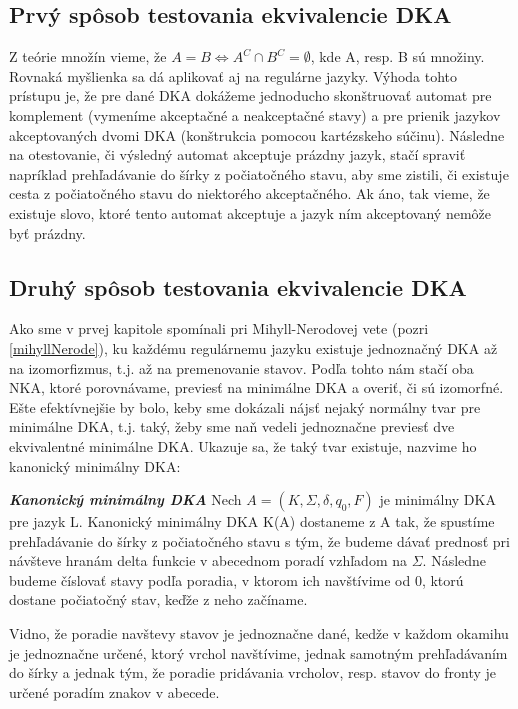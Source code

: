 \subsection{Prvý spôsob testovania ekvivalencie DKA}
Z teórie množín vieme, že $A = B \Longleftrightarrow A^C \cap B^C = \emptyset$, kde A, resp. B sú množiny. Rovnaká myšlienka sa dá aplikovať aj na regulárne jazyky. Výhoda tohto prístupu je, že pre dané DKA dokážeme jednoducho skonštruovať automat pre komplement (vymeníme akceptačné a neakceptačné stavy) a pre prienik jazykov akceptovaných dvomi DKA (konštrukcia pomocou kartézskeho súčinu). Následne na otestovanie, či výsledný automat akceptuje prázdny jazyk, stačí spraviť napríklad prehľadávanie do šírky z počiatočného stavu, aby sme zistili, či existuje cesta z počiatočného stavu do niektorého akceptačného. Ak áno, tak vieme, že existuje slovo, ktoré tento automat akceptuje a jazyk ním akceptovaný nemôže byť prázdny.

\subsection{Druhý spôsob testovania ekvivalencie DKA}
Ako sme v prvej kapitole spomínali pri Mihyll-Nerodovej vete (pozri \ref{mihyllNerode}), ku každému regulárnemu jazyku existuje jednoznačný DKA až na izomorfizmus, t.j. až na premenovanie stavov. Podľa tohto nám stačí oba NKA, ktoré porovnávame, previesť na minimálne DKA a overiť, či sú izomorfné. Ešte efektívnejšie by bolo, keby sme dokázali nájsť nejaký normálny tvar pre minimálne DKA, t.j. taký, žeby sme naň vedeli jednoznačne previesť dve ekvivalentné minimálne DKA. Ukazuje sa, že taký tvar existuje, nazvime ho kanonický minimálny DKA:
\\

\label{kanMinDKA}
\begin{defn}{\textbf {\textit {Kanonický minimálny DKA}}} Nech $A = (K,\Sigma,\delta,q_0,F)$ je minimálny DKA pre jazyk L. Kanonický minimálny DKA K(A) dostaneme z A tak, že spustíme prehľadávanie do šírky z počiatočného stavu s tým, že budeme dávať prednosť pri návšteve hranám delta funkcie v abecednom poradí vzhľadom na $\Sigma$. Následne budeme číslovať stavy podľa poradia, v ktorom ich navštívime od 0, ktorú dostane počiatočný stav, keďže z neho začíname.
\end{defn}
Vidno, že poradie navštevy stavov je jednoznačne dané, kedže v každom okamihu je jednoznačne určené, ktorý vrchol navštívime, jednak samotným prehľadávaním do šírky a jednak tým, že poradie pridávania vrcholov, resp. stavov do fronty je určené poradím znakov v abecede.

